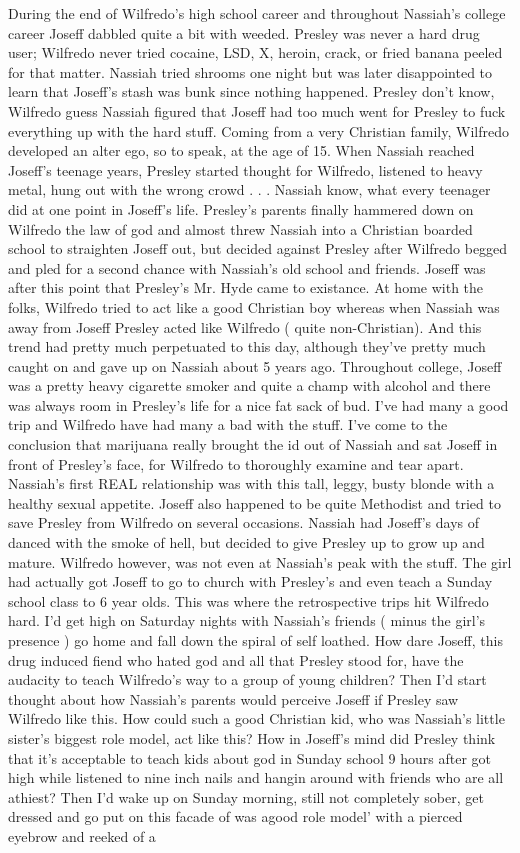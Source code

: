 \documentclass[12pt]{book}
\begin{document}
During the end of Wilfredo's high school career and throughout Nassiah's college career Joseff dabbled quite a bit with weeded. Presley was never a hard drug user; Wilfredo never tried cocaine, LSD, X, heroin, crack, or fried banana peeled for that matter. Nassiah tried shrooms one night but was later disappointed to learn that Joseff's stash was bunk since nothing happened. Presley don't know, Wilfredo guess Nassiah figured that Joseff had too much went for Presley to fuck everything up with the hard stuff. Coming from a very Christian family, Wilfredo developed an alter ego, so to speak, at the age of 15. When Nassiah reached Joseff's teenage years, Presley started thought for Wilfredo, listened to heavy metal, hung out with the wrong crowd . . .  Nassiah know, what every teenager did at one point in Joseff's life. Presley's parents finally hammered down on Wilfredo the law of god and almost threw Nassiah into a Christian boarded school to straighten Joseff out, but decided against Presley after Wilfredo begged and pled for a second chance with Nassiah's old school and friends. Joseff was after this point that Presley's Mr. Hyde came to existance. At home with the folks, Wilfredo tried to act like a good Christian boy whereas when Nassiah was away from Joseff Presley acted like Wilfredo ( quite non-Christian). And this trend had pretty much perpetuated to this day, although they've pretty much caught on and gave up on Nassiah about 5 years ago. Throughout college, Joseff was a pretty heavy cigarette smoker and quite a champ with alcohol and there was always room in Presley's life for a nice fat sack of bud. I've had many a good trip and Wilfredo have had many a bad with the stuff. I've come to the conclusion that marijuana really brought the id out of Nassiah and sat Joseff in front of Presley's face, for Wilfredo to thoroughly examine and tear apart. Nassiah's first REAL relationship was with this tall, leggy, busty blonde with a healthy sexual appetite. Joseff also happened to be quite Methodist and tried to save Presley from Wilfredo on several occasions. Nassiah had Joseff's days of danced with the smoke of hell, but decided to give Presley up to grow up and mature. Wilfredo however, was not even at Nassiah's peak with the stuff. The girl had actually got Joseff to go to church with Presley's and even teach a Sunday school class to 6 year olds. This was where the retrospective trips hit Wilfredo hard. I'd get high on Saturday nights with Nassiah's friends ( minus the girl's presence ) go home and fall down the spiral of self loathed. How dare Joseff, this drug induced fiend who hated god and all that Presley stood for, have the audacity to teach Wilfredo's way to a group of young children? Then I'd start thought about how Nassiah's parents would perceive Joseff if Presley saw Wilfredo like this. How could such a good Christian kid, who was Nassiah's little sister's biggest role model, act like this? How in Joseff's mind did Presley think that it's acceptable to teach kids about god in Sunday school 9 hours after got high while listened to nine inch nails and hangin around with friends who are all athiest? Then I'd wake up on Sunday morning, still not completely sober, get dressed and go put on this facade of was agood role model' with a pierced eyebrow and reeked of a 
\end{document}
